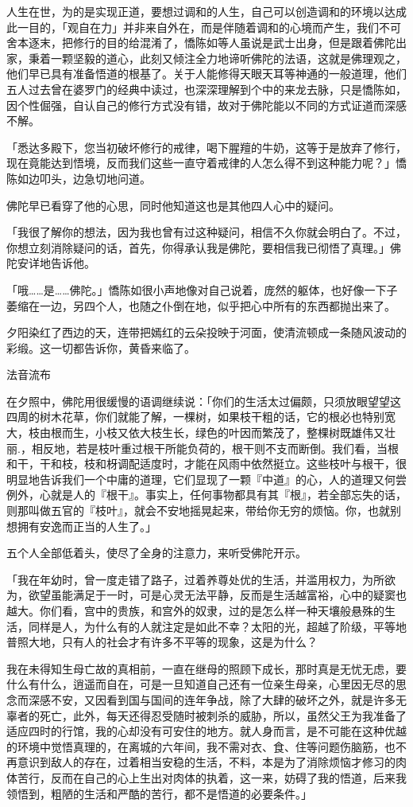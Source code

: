\documentclass[12pt,twoside,openany]{book}
\begin{document}
人生在世，为的是实现正道，要想过调和的人生，自己可以创造调和的环境以达成此一目的，「观自在力」并非来自外在，而是伴随着调和的心境而产生，我们不可舍本逐末，把修行的目的给混淆了，憍陈如等人虽说是武士出身，但是跟着佛陀出家，秉着一颗坚毅的道心，此刻又倾注全力地谛听佛陀的法语，这就是佛理观之，他们早已具有准备悟道的根基了。关于人能修得天眼天耳等神通的一般道理，他们五人过去曾在婆罗门的经典中读过，也深深理解到个中的来龙去脉，只是憍陈如，因个性倔强，自认自己的修行方式没有错，故对于佛陀能以不同的方式证道而深感不解。

「悉达多殿下，您当初破坏修行的戒律，喝下腥羶的牛奶，这等于是放弃了修行，现在竟能达到悟境，反而我们这些一直守着戒律的人怎么得不到这种能力呢？」憍陈如边叩头，边急切地问道。

佛陀早已看穿了他的心思，同时他知道这也是其他四人心中的疑问。

「我很了解你的想法，因为我也曾有过这种疑问，相信不久你就会明白了。不过，你想立刻消除疑问的话，首先，你得承认我是佛陀，要相信我已彻悟了真理。」佛陀安详地告诉他。

「哦……是……佛陀。」憍陈如很小声地像对自己说着，庞然的躯体，也好像一下子萎缩在一边，另四个人，也随之仆倒在地，似乎把心中所有的东西都抛出来了。

夕阳染红了西边的天，连带把嫣红的云朵投映于河面，使清流顿成一条随风波动的彩缎。这一切都告诉你，黄昏来临了。

法音流布

在夕照中，佛陀用很缓慢的语调继续说：「你们的生活太过偏颇，只须放眼望望这四周的树木花草，你们就能了解，一棵树，如果枝干粗的话，它的根必也特别宽大，枝由根而生，小枝又依大枝生长，绿色的叶因而繁茂了，整棵树既雄伟又壮丽.，相反地，若是枝叶重过根干所能负荷的，根干则不支而断倒。我们看，当根和干，干和枝，枝和枒调配适度时，才能在风雨中依然挺立。这些枝叶与根干，很明显地告诉我们一个中庸的道理，它们显现了一颗『中道』的心，人的道理又何尝例外，心就是人的『根干』。事实上，任何事物都具有其『根』，若全部忘失的话，则那叫做五官的『枝叶』，就会不安地摇晃起来，带给你无穷的烦恼。你，也就别想拥有安逸而正当的人生了。」

五个人全部低着头，使尽了全身的注意力，来听受佛陀开示。

「我在年幼时，曾一度走错了路子，过着养尊处优的生活，并滥用权力，为所欲为，欲望虽能满足于一时，可是心灵无法平静，反而是生活越富裕，心中的疑窦也越大。你们看，宫中的贵族，和宫外的奴隶，过的是怎么样一种天壤般悬殊的生活，同样是人，为什么有的人就注定是如此不幸？太阳的光，超越了阶级，平等地普照大地，只有人的社会才有许多不平等的现象，这是为什么？

我在未得知生母亡故的真相前，一直在继母的照顾下成长，那时真是无忧无虑，要什么有什么，逍遥而自在，可是一旦知道自己还有一位亲生母亲，心里因无尽的思念而深感不安，又因看到国与国间的连年争战，除了大肆的破坏之外，就是许多无辜者的死亡，此外，每天还得忍受随时被刺杀的威胁，所以，虽然父王为我准备了适应四时的行馆，我的心却没有可安住的地方。就人身而言，是不可能在这种优越的环境中觉悟真理的，在离城的六年间，我不需对衣、食、住等问题伤脑筋，也不再意识到敌人的存在，过着相当安稳的生活，不料，本是为了消除烦恼才修习的肉体苦行，反而在自己的心上生出对肉体的执着，这一来，妨碍了我的悟道，后来我领悟到，粗陋的生活和严酷的苦行，都不是悟道的必要条件。」
\end{document}
